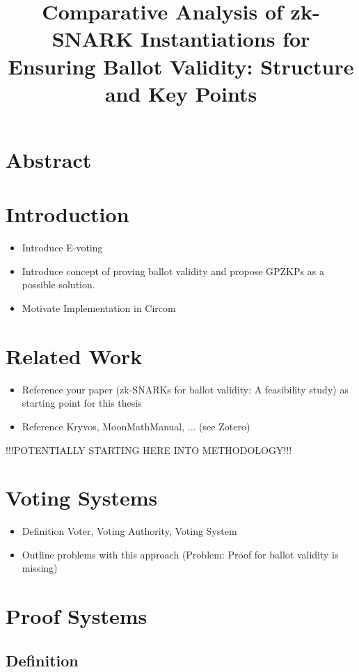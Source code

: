 \documentclass{article}
\title{Comparative Analysis of zk-SNARK
Instantiations for Ensuring Ballot Validity: Structure and Key Points}
\author{}
\date{}
\begin{document}
\maketitle

\section*{Abstract}

\section{Introduction}
\begin{itemize}
    \item Introduce E-voting
    \item Introduce concept of proving ballot validity and propose GPZKPs as a possible solution.
    \item Motivate Implementation in Circom
\end{itemize}

\section{Related Work}
\begin{itemize}
    \item Reference your paper (zk-SNARKs for ballot validity: A feasibility study) as starting point for this thesis
    \item Reference Kryvos, MoonMathManual, ... (see Zotero)
\end{itemize}

!!!POTENTIALLY STARTING HERE INTO METHODOLOGY!!!
\section{Voting Systems}
\begin{itemize}
    \item Definition Voter, Voting Authority, Voting System
    \item Outline problems with this approach (Problem: Proof for ballot validity is missing)
\end{itemize}

\section{Proof Systems}
\subsection{Definition}
\end{document}
